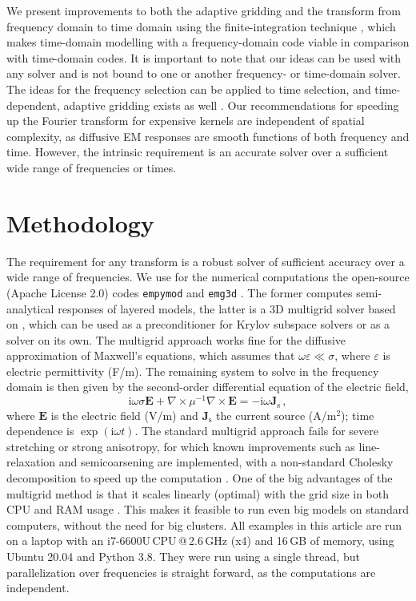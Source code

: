 \documentclass[extra, camera,%
]{gji}
\newcommand{\emg}[2]{\texttt{emg#1#2}\xspace}
\newcommand{\empymod}{\texttt{empymod}\xspace}
\begin{document}
We present improvements to both the adaptive gridding and the transform from
frequency domain to time domain using the finite-integration technique
\citep{AEU.77.Weiland}, which makes time-domain modelling with a
frequency-domain code viable in comparison with time-domain codes. It is
important to note that our ideas can be used with any solver and is not bound
to one or another frequency- or time-domain solver. The ideas for the frequency
selection can be applied to time selection, and time-dependent, adaptive
gridding exists as well \citep[e.g., ][]{RS.06.Commer}. Our recommendations for
speeding up the Fourier transform for expensive kernels are independent of
spatial complexity, as diffusive EM responses are smooth functions of both
frequency and time. However, the intrinsic requirement is an accurate solver
over a sufficient wide range of frequencies or times.


\section{Methodology} %

The requirement for any transform is a robust solver of sufficient accuracy
over a wide range of frequencies. We use for the numerical computations the
open-source (Apache License 2.0) codes \empymod \citep{GEO.17.Werthmuller} and
\emg3d \citep{JOSS.19.Werthmuller}. The former computes semi-analytical
responses of layered models, the latter is a 3D multigrid solver based on
\cite{GP.06.Mulder}, which can be used as a preconditioner for Krylov subspace
solvers or as a solver on its own. The multigrid approach works fine for the
diffusive approximation of Maxwell's equations, which assumes that
$\omega\varepsilon \ll \sigma$, where $\varepsilon$ is electric permittivity
(F/m). The remaining system to solve in the frequency domain is then given by
the second-order differential equation of the electric field,
%
\begin{equation}
    \mathrm{i}\omega\sigma \mathbf{E} +
    \nabla \times \mu^{-1} \nabla \times \mathbf{E}
    = -\mathrm{i}\omega\mathbf{J}_\mathrm{s} \, ,
  \label{eq:maxwell}
\end{equation}
%
where $\mathbf{E}$ is the electric field (V/m) and $\mathbf{J}_\mathrm{s}$ the
current source (A/m$^2$); time dependence is $\exp(\mathrm{i}\omega t)$. The
standard multigrid approach fails for severe stretching or strong anisotropy,
for which known improvements such as line-relaxation and semicoarsening
\citep{ECCFD.06.Jonsthovel} are implemented, with a non-standard Cholesky
decomposition to speed up the computation \citep{GEO.08.Mulder}. One of the big
advantages of the multigrid method is that it scales linearly (optimal) with
the grid size in both CPU and RAM usage \citep{B.Springer.20.Mulder}. This
makes it feasible to run even big models on standard computers, without the
need for big clusters. All examples in this article are run on a laptop with an
i7-6600U\,CPU\,@\,2.6\,GHz (x4) and 16\,GB of memory, using Ubuntu 20.04 and
Python 3.8. They were run using a single thread, but parallelization over
frequencies is straight forward, as the computations are independent.
\end{document}
